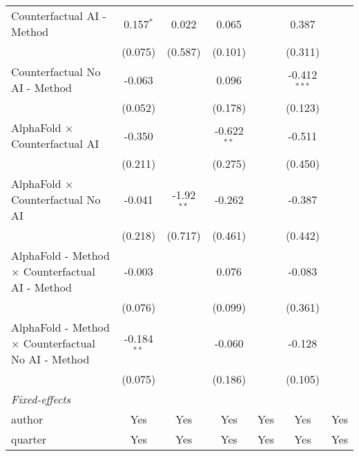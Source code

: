\begin{tabular}{lcccccc}
   Counterfactual AI - Method                                 & 0.157$^{*}$   & 0.022        & 0.065         &         & 0.387          &   \\   
                                                              & (0.075)       & (0.587)      & (0.101)       &         & (0.311)        &   \\   
   Counterfactual No AI - Method                              & -0.063        &              & 0.096         &         & -0.412$^{***}$ &   \\   
                                                              & (0.052)       &              & (0.178)       &         & (0.123)        &   \\   
   AlphaFold $\times$ Counterfactual AI                       & -0.350        &              & -0.622$^{**}$ &         & -0.511         &   \\   
                                                              & (0.211)       &              & (0.275)       &         & (0.450)        &   \\   
   AlphaFold $\times$ Counterfactual No AI                    & -0.041        & -1.92$^{**}$ & -0.262        &         & -0.387         &   \\   
                                                              & (0.218)       & (0.717)      & (0.461)       &         & (0.442)        &   \\   
   AlphaFold - Method $\times$ Counterfactual AI - Method     & -0.003        &              & 0.076         &         & -0.083         &   \\   
                                                              & (0.076)       &              & (0.099)       &         & (0.361)        &   \\   
   AlphaFold - Method $\times$ Counterfactual No AI - Method  & -0.184$^{**}$ &              & -0.060        &         & -0.128         &   \\   
                                                              & (0.075)       &              & (0.186)       &         & (0.105)        &   \\   
   \midrule
   \emph{Fixed-effects}\\
   author                                                     & Yes           & Yes          & Yes           & Yes     & Yes            & Yes\\  
   quarter                                                    & Yes           & Yes          & Yes           & Yes     & Yes            & Yes\\  

\end{tabular}
